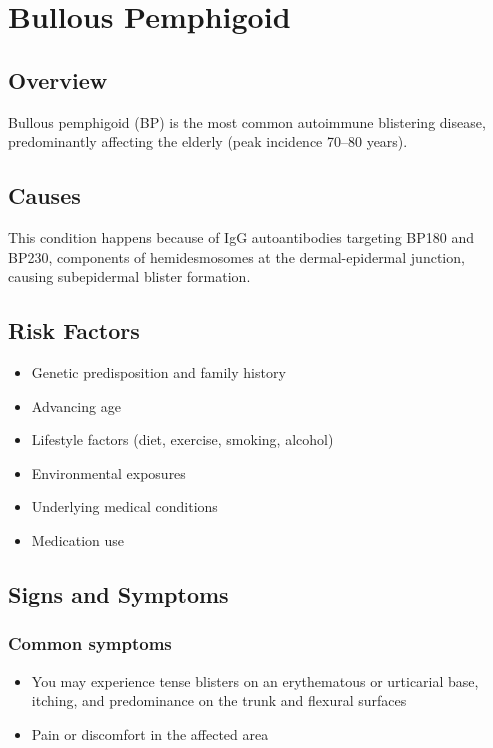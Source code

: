 \chapter{Bullous Pemphigoid}
\label{sec:Bullous Pemphigoid}

\section{Overview}
Bullous pemphigoid (BP) is the most common autoimmune blistering disease, predominantly affecting the elderly (peak incidence 70--80 years).
\section{Causes}
This condition happens because of IgG autoantibodies targeting BP180 and BP230, components of hemidesmosomes at the dermal-epidermal junction, causing subepidermal blister formation.     
\section{Risk Factors}

\begin{itemize}[noitemsep]
  \item Genetic predisposition and family history
  \item Advancing age
  \item Lifestyle factors (diet, exercise, smoking, alcohol)
  \item Environmental exposures
  \item Underlying medical conditions
  \item Medication use
\end{itemize}
\section{Signs and Symptoms}

\subsection{Common symptoms}
\begin{itemize}[noitemsep]
  \item You may experience tense blisters on an erythematous or urticarial base, itching, and predominance on the trunk and flexural surfaces

  \item Pain or discomfort in the affected area
  \end{itemize}

